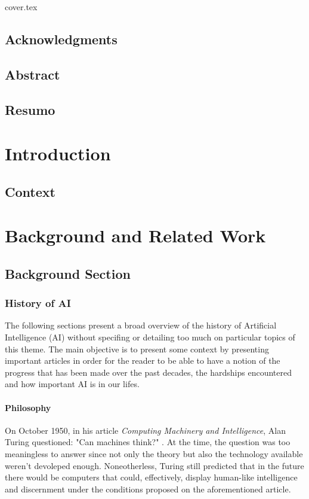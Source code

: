 \documentclass[a4paper, 12pt]{report}
\makeatletter
\newcommand\frontmatter{%
    \cleardoublepage
  \pagenumbering{roman}}
\newcommand\mainmatter{%
    \cleardoublepage
  \pagenumbering{arabic}}
\makeatother
\begin{document}
{cover.tex}

\tableofcontents
\frontmatter
\section*{Acknowledgments}
\newpage
\section*{Abstract}
\newpage
\section*{Resumo}

\mainmatter


\newpage

\chapter{Introduction}
\section{Context}

\newpage
\chapter{Background and Related Work}
\section{Background Section}

\subsection{History of AI}
The following sections present a broad overview of the history of Artificial Intelligence (AI) without specifing or detailing too much on particular topics of this theme. The main objective is to present some context by presenting important articles in order for the reader to be able to have a notion of the progress that has been made over the past decades, the hardships encountered and how important AI is in our lifes. 
\subsubsection{Philosophy}
On October 1950, in his article \textit{Computing Machinery and Intelligence}, Alan Turing questioned: "Can machines think?" \autocite{turingCOMPUTINGMACHINERYINTELLIGENCE1950}. At the time, the question was too meaningless to answer since not only the theory but also the technology available weren't devoleped enough. Noneotherless, Turing still predicted that in the future there would be computers that could, effectively, display human-like intelligence and discernment under the conditions proposed on the aforementioned article.
\end{document}
